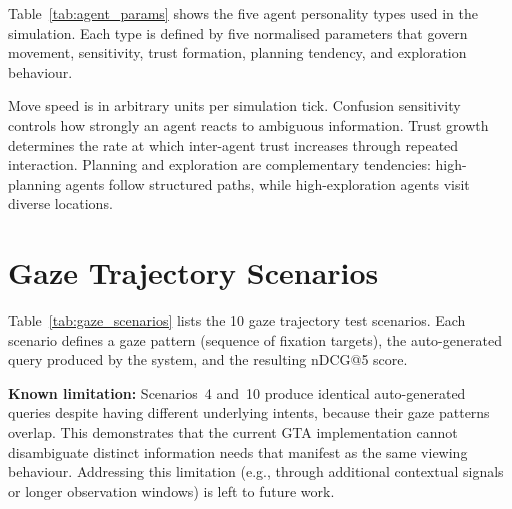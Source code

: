 \documentclass[journal]{IEEEtran}
\begin{document}
Table~\ref{tab:agent_params} shows the five agent personality types used in the simulation.
Each type is defined by five normalised parameters that govern movement, sensitivity, trust formation, planning tendency, and exploration behaviour.

\begin{table}[!t]
\caption{Agent Personality Parameters}
\label{tab:agent_params}
\centering
{}
\end{table}

Move speed is in arbitrary units per simulation tick.
Confusion sensitivity controls how strongly an agent reacts to ambiguous information.
Trust growth determines the rate at which inter-agent trust increases through repeated interaction.
Planning and exploration are complementary tendencies: high-planning agents follow structured paths, while high-exploration agents visit diverse locations.

\section{Gaze Trajectory Scenarios}
\label{app:gaze_scenarios}

Table~\ref{tab:gaze_scenarios} lists the 10 gaze trajectory test scenarios.
Each scenario defines a gaze pattern (sequence of fixation targets), the auto-generated query produced by the system, and the resulting nDCG@5 score.

\textbf{Known limitation:} Scenarios~4 and~10 produce identical auto-generated queries despite having different underlying intents, because their gaze patterns overlap.  This demonstrates that the current GTA implementation cannot disambiguate distinct information needs that manifest as the same viewing behaviour.  Addressing this limitation (e.g., through additional contextual signals or longer observation windows) is left to future work.
\end{document}
